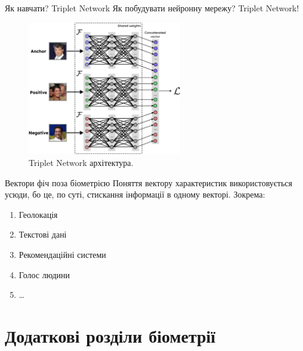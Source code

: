 \documentclass{zkdl-presentation-template}
\begin{document}
    \begin{frame}{Як навчати? Triplet Network}
        Як побудувати нейронну мережу? Triplet Network!
        
        \begin{figure}
        \centering
            \includegraphics[width=0.6\textwidth]{images/triplet_network.png}
            \caption{Triplet Network архітектура.}
        \end{figure}
    \end{frame}

    \begin{frame}{Вектори фіч поза біометрією}
        Поняття вектору характеристик використовується усюди, бо це, по суті,
        стискання інформації в одному векторі. Зокрема:
        \begin{enumerate}
            \item Геолокація
            \item Текстові дані
            \item Рекомендаційні системи
            \item Голос людини
            \item \dots
        \end{enumerate}
    \end{frame}

    \section{Додаткові розділи біометрії}
\end{document}
